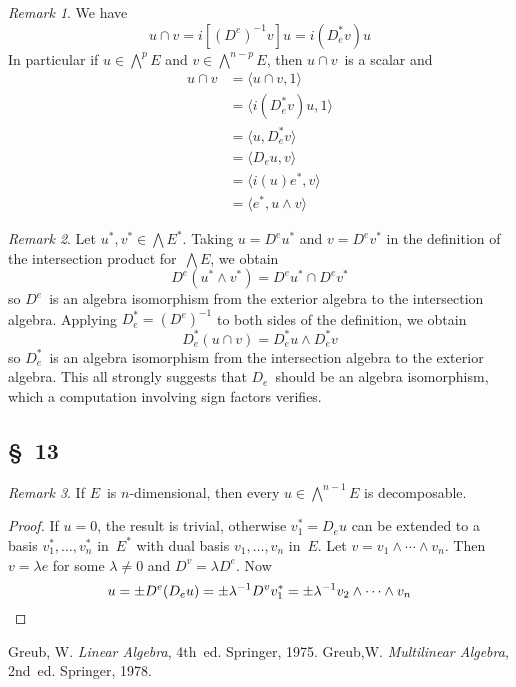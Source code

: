 \documentclass[letterpaper,12pt]{article}
\newcommand{\sect}{\cap}
\newcommand{\eprod}{\wedge}
\newcommand{\bigeprod}{\bigwedge}
\newcommand{\medeprod}{{\textstyle\bigeprod}}
\newcommand{\sprod}[2]{\langle#1,#2\rangle}
\newcommand{\multi}[4]{#2_{#3}#1\cdots#1#2_{#4}}
\newcommand{\eprods}[3]{\multi{\eprod}{#1}{#2}{#3}}
\theoremstyle{definition}
\theoremstyle{remark}
\newtheorem*{rmk}{Remark}
\begin{document}
\begin{rmk}
We have
\[u\sect v=i[(D^e)^{-1}v]u=i(D_e^* v)u\]
In particular if \(u\in\medeprod^p E\) and \(v\in\medeprod^{n-p}E\), then \(u\sect v\)~is a scalar and
\begin{align*}
u\sect v&=\sprod{u\sect v}{1}\\
	&=\sprod{i(D_e^* v)u}{1}\\
	&=\sprod{u}{D_e^* v}\\
	&=\sprod{D_e u}{v}\\
	&=\sprod{i(u)e^*}{v}\\
	&=\sprod{e^*}{u\eprod v}
\end{align*}
\end{rmk}

\begin{rmk}
Let \(u^*,v^*\in\medeprod E^*\). Taking \(u=D^e u^*\) and \(v=D^e v^*\) in the definition of the intersection product for~\(\medeprod E\), we obtain
\[D^e(u^*\eprod v^*)=D^e u^*\sect D^e v^*\]
so \(D^e\)~is an algebra isomorphism from the exterior algebra to the intersection algebra. Applying \(D_e^*=(D^e)^{-1}\) to both sides of the definition, we obtain
\[D_e^*(u\sect v)=D_e^* u\eprod D_e^* v\]
so \(D_e^*\)~is an algebra isomorphism from the intersection algebra to the exterior algebra. This all strongly suggests that \(D_e\)~should be an algebra isomorphism, which a computation involving sign factors verifies.
\end{rmk}

\subsection*{\S~13}
\begin{rmk}
If \(E\)~is \(n\)-dimensional, then every \(u\in\medeprod^{n-1}E\) is decomposable.
\end{rmk}
\begin{proof}
If \(u=0\), the result is trivial, otherwise \(v^*_1=D_e u\) can be extended to a basis \(v^*_1,\ldots,v^*_n\) in~\(E^*\) with dual basis \(v_1,\ldots,v_n\) in~\(E\). Let \(v=\eprods{v}{1}{n}\). Then \(v=\lambda e\) for some \(\lambda\ne 0\) and \(D^v=\lambda D^e\). Now
\[u=\pm D^e(D_e u)=\pm\lambda^{-1}D^v v^*_1=\pm\lambda^{-1}\eprods{v}{2}{n}\qedhere\]
\end{proof}

\newpage
\begin{thebibliography}{0}
 Greub, W. \textit{Linear Algebra}, 4th~ed. Springer, 1975.
 Greub,W. \textit{Multilinear Algebra}, 2nd~ed. Springer, 1978.
\end{thebibliography}
\end{document}
